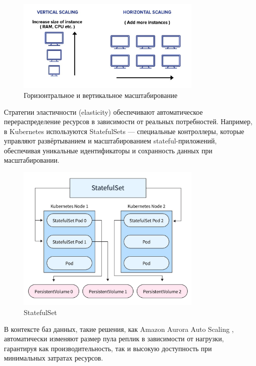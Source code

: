 \begin{figure}[h]
    \centering
    \includegraphics[width=0.8\textwidth]{assets/ScalingAvail.png}
    \caption{Горизонтральное и вертикальное масштабирование}
    \label{fig:Scaling1}
\end{figure}

Стратегии эластичности (elasticity) обеспечивают автоматическое перераспределение ресурсов в зависимости от реальных потребностей. Например, в Kubernetes используются StatefulSets \autocite{StatefulSetsApps} — специальные контроллеры, которые управляют развёртыванием и масштабированием stateful-приложений, обеспечивая уникальные идентификаторы и сохранность данных при масштабировании. 

\begin{figure}[H]
    \centering
    \includegraphics[width=0.8\textwidth]{assets/StatefulSet.png}
    \caption{StatefulSet}
    \label{fig:Scaling2}
\end{figure}

В контексте баз данных, такие решения, как Amazon Aurora Auto Scaling \autocite{AuroraAutoScaling}, автоматически изменяют размер пула реплик в зависимости от нагрузки, гарантируя как производительность, так и высокую доступность при минимальных затратах ресурсов.

